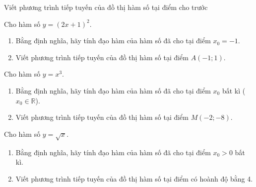 \begin{dang}{Viết phương trình tiếp tuyến của đồ thị hàm số tại điểm cho trước}
\end{dang}


\begin{vd}%
	Cho hàm số $y=(2 x+1)^2$.
	\begin{enumerate}
		\item  Bằng định nghĩa, hãy tính đạo hàm của hàm số đã cho tại điểm $x_0=-1$.
		\item  Viết phương trình tiếp tuyến của đồ thị hàm số tại điểm $A(-1 ; 1)$.
	\end{enumerate}
	
\end{vd}%

\begin{vd}%
	Cho hàm số $y=x^3$.
	\begin{enumerate}
		\item  Bằng định nghĩa, hãy tính đạo hàm của hàm số đã cho tại điểm $x_0$ bất kì ($x_0 \in \mathbb{R}$).
		\item  Viết phương trình tiếp tuyến của đồ thị hàm số tại điểm $M(-2;-8)$.
	\end{enumerate}
	\loigiai{
	}
\end{vd}%

\begin{vd}%
	Cho hàm số $y=\sqrt{x}$.
	\begin{enumerate}
		\item  Bằng định nghĩa, hãy tính đạo hàm của hàm số đã cho tại điểm $x_0>0$ bất kì.
		\item  Viết phương trình tiếp tuyến của đồ thị hàm số tại điểm có hoành độ bằng 4.
	\end{enumerate}
	\loigiai{
	}
\end{vd}%

